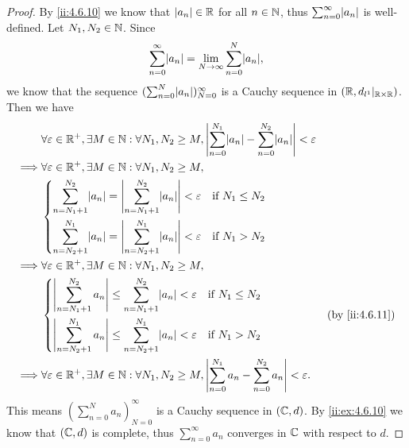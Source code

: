 \begin{proof}
  By \cref{ii:4.6.10} we know that \(\left\lvert a_n\right\rvert \in \mathbb{R}\) for all \(n \in \mathbb{N}\), thus \(\sum_{n = 0}^\infty \abs{a_n}\) is well-defined.
  Let \(N_1, N_2 \in \mathbb{N}\).
  Since
  \[
    \sum_{n = 0}^\infty \abs{a_n} = \lim_{N \to \infty} \sum_{n = 0}^N \abs{a_n},
  \]
  we know that the sequence \((\sum_{n = 0}^N \abs{a_n})_{N = 0}^\infty\) is a Cauchy sequence in \((\mathbb{R}, d_{l^1}|_{\mathbb{R} \times \mathbb{R}})\).
  Then we have
  \begin{align*}
             & \forall \varepsilon \in \R^+, \exists M \in \N : \forall N_1, N_2 \geq M, \abs{\sum_{n = 0}^{N_1} \abs{a_n} - \sum_{n = 0}^{N_2} \abs{a_n}} < \varepsilon \\
    \implies & \forall \varepsilon \in \R^+, \exists M \in \N : \forall N_1, N_2 \geq M,                                                                                 \\
             & \begin{dcases}
                 \sum_{n = N_1 + 1}^{N_2} \abs{a_n} = \abs{\sum_{n = N_1 + 1}^{N_2} \abs{a_n}} < \varepsilon & \text{if } N_1 \leq N_2 \\
                 \sum_{n = N_2 + 1}^{N_1} \abs{a_n} = \abs{\sum_{n = N_2 + 1}^{N_1} \abs{a_n}} < \varepsilon & \text{if } N_1 > N_2
               \end{dcases}                        \\
    \implies & \forall \varepsilon \in \R^+, \exists M \in \N : \forall N_1, N_2 \geq M,                                                                                 \\
             & \begin{dcases}
                 \abs{\sum_{n = N_1 + 1}^{N_2} a_n} \leq \sum_{n = N_1 + 1}^{N_2} \abs{a_n} < \varepsilon & \text{if } N_1 \leq N_2 \\
                 \abs{\sum_{n = N_2 + 1}^{N_1} a_n} \leq \sum_{n = N_2 + 1}^{N_1} \abs{a_n} < \varepsilon & \text{if } N_1 > N_2
               \end{dcases}                                      &  & \by{ii:4.6.11}                                         \\
    \implies & \forall \varepsilon \in \R^+, \exists M \in \N : \forall N_1, N_2 \geq M, \abs{\sum_{n = 0}^{N_1} a_n - \sum_{n = 0}^{N_2} a_n} < \varepsilon.
  \end{align*}
  This means \((\sum_{n = 0}^N a_n)_{N = 0}^\infty\) is a Cauchy sequence in \((\mathbb{C}, d)\).
  By \cref{ii:ex:4.6.10} we know that \((\mathbb{C}, d)\) is complete, thus \(\sum_{n = 0}^\infty a_n\) converges in \(\mathbb{C}\) with respect to \(d\).
\end{proof}

